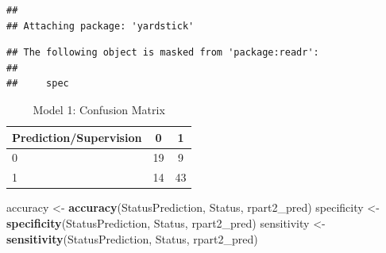 \documentclass[
]{article}
\newenvironment{Shaded}{\begin{snugshade}}{\end{snugshade}}
\newcommand{\AttributeTok}[1]{\textcolor[rgb]{0.13,0.29,0.53}{#1}}
\newcommand{\CommentTok}[1]{\textcolor[rgb]{0.56,0.35,0.01}{\textit{#1}}}
\newcommand{\ConstantTok}[1]{\textcolor[rgb]{0.56,0.35,0.01}{#1}}
\newcommand{\DecValTok}[1]{\textcolor[rgb]{0.00,0.00,0.81}{#1}}
\newcommand{\FunctionTok}[1]{\textcolor[rgb]{0.13,0.29,0.53}{\textbf{#1}}}
\newcommand{\NormalTok}[1]{#1}
\newcommand{\OtherTok}[1]{\textcolor[rgb]{0.56,0.35,0.01}{#1}}
\newcommand{\SpecialCharTok}[1]{\textcolor[rgb]{0.81,0.36,0.00}{\textbf{#1}}}
\newcommand{\StringTok}[1]{\textcolor[rgb]{0.31,0.60,0.02}{#1}}
\begin{document}
\begin{verbatim}
## 
## Attaching package: 'yardstick'
\end{verbatim}

\begin{verbatim}
## The following object is masked from 'package:readr':
## 
##     spec
\end{verbatim}

\begin{Shaded}
\end{Shaded}

\begin{table}[H]

\caption{\label{tab:unnamed-chunk-29}Model 1: Confusion Matrix}
\centering
\begin{tabular}[t]{lcc}
\toprule
Prediction/Supervision & 0 & 1\\
\midrule
0 & 19 & 9\\
1 & 14 & 43\\
\bottomrule
\end{tabular}
\end{table}

\begin{Shaded}
\begin{Highlighting}[]
\NormalTok{accuracy }\OtherTok{\textless{}{-}} \FunctionTok{accuracy}\NormalTok{(StatusPrediction, Status, rpart2\_pred)}
\NormalTok{specificity }\OtherTok{\textless{}{-}} \FunctionTok{specificity}\NormalTok{(StatusPrediction, Status, rpart2\_pred)}
\NormalTok{sensitivity }\OtherTok{\textless{}{-}} \FunctionTok{sensitivity}\NormalTok{(StatusPrediction, Status, rpart2\_pred)}
\end{Highlighting}
\end{Shaded}
\end{document}
